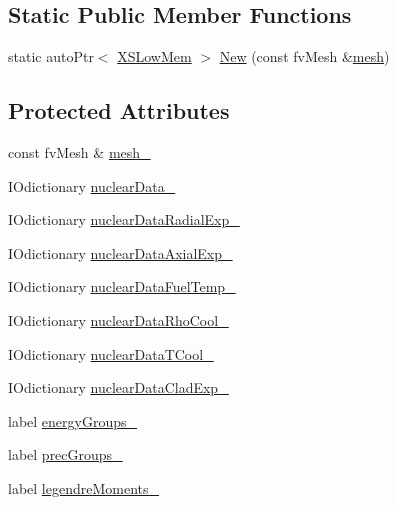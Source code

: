 \subsection*{Static Public Member Functions}
\begin{DoxyCompactItemize}
\item 
static auto\+Ptr$<$ \hyperlink{classFoam_1_1XSLowMem}{X\+S\+Low\+Mem} $>$ \hyperlink{classFoam_1_1XSLowMem_a655f21c7e70e717a1718fa380e4de287}{New} (const fv\+Mesh \&\hyperlink{createMeshesPostProcess_8H_a8bb1e58291d2d2b653e024a4f4bffe38}{mesh})
\end{DoxyCompactItemize}
\subsection*{Protected Attributes}
\begin{DoxyCompactItemize}
\item 
const fv\+Mesh \& \hyperlink{classFoam_1_1XSLowMem_a23edeeeecebcef11921a33dd5d990570}{mesh\+\_\+}
\item 
I\+Odictionary \hyperlink{classFoam_1_1XSLowMem_a5f8311a3a430c76dd8ad948460751646}{nuclear\+Data\+\_\+}
\item 
I\+Odictionary \hyperlink{classFoam_1_1XSLowMem_a9480d6e0437856b9c8f92ff75bc2b293}{nuclear\+Data\+Radial\+Exp\+\_\+}
\item 
I\+Odictionary \hyperlink{classFoam_1_1XSLowMem_a63645f4a1c5df874d88ae896920a8971}{nuclear\+Data\+Axial\+Exp\+\_\+}
\item 
I\+Odictionary \hyperlink{classFoam_1_1XSLowMem_a48e05dd8011f2d4305e3bad0f0fe1f0a}{nuclear\+Data\+Fuel\+Temp\+\_\+}
\item 
I\+Odictionary \hyperlink{classFoam_1_1XSLowMem_a15c1504755965c53fbbe6a429abc28a8}{nuclear\+Data\+Rho\+Cool\+\_\+}
\item 
I\+Odictionary \hyperlink{classFoam_1_1XSLowMem_ae38071e829db93ddf1c47ee3d8df5c4d}{nuclear\+Data\+T\+Cool\+\_\+}
\item 
I\+Odictionary \hyperlink{classFoam_1_1XSLowMem_afa518738c6f456b2cec2aaa1ad8ddf43}{nuclear\+Data\+Clad\+Exp\+\_\+}
\item 
label \hyperlink{classFoam_1_1XSLowMem_a455b047ba459073908c08fd5e087dc45}{energy\+Groups\+\_\+}
\item 
label \hyperlink{classFoam_1_1XSLowMem_acf21654ea27e2240302c291a95738ea2}{prec\+Groups\+\_\+}
\item 
label \hyperlink{classFoam_1_1XSLowMem_a3ff89536c8e3ea70e46d35eccdfbfc4a}{legendre\+Moments\+\_\+}
\item 

\end{DoxyCompactItemize}
